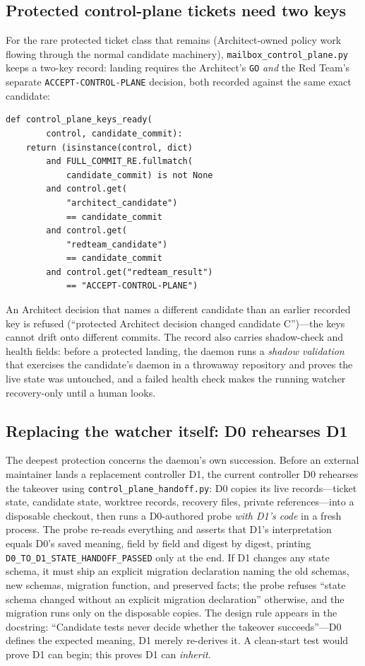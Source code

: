 \documentclass[10pt,aps,prd,twocolumn,nofootinbib]{revtex4-2}
\newcommand{\code}[1]{\texttt{#1}}
\newcommand{\file}[1]{\texttt{#1}}
\begin{document}
\subsection{Protected control-plane tickets need two keys}

For the rare protected ticket class that remains (Architect-owned
policy work flowing through the normal candidate machinery),
\file{mailbox\_control\_plane.py} keeps a two-key record: landing
requires the Architect's \code{GO} \emph{and} the Red Team's separate
\code{ACCEPT-CONTROL-PLANE} decision, both recorded against the same
exact candidate:

\begin{verbatim}
def control_plane_keys_ready(
        control, candidate_commit):
    return (isinstance(control, dict)
        and FULL_COMMIT_RE.fullmatch(
            candidate_commit) is not None
        and control.get(
            "architect_candidate")
            == candidate_commit
        and control.get(
            "redteam_candidate")
            == candidate_commit
        and control.get("redteam_result")
            == "ACCEPT-CONTROL-PLANE")
\end{verbatim}

An Architect decision that names a different candidate than an
earlier recorded key is refused (``protected Architect decision
changed candidate C'')---the keys cannot drift onto different
commits.  The record also carries shadow-check and health fields:
before a protected landing, the daemon runs a \emph{shadow
validation} that exercises the candidate's daemon in a throwaway
repository and proves the live state was untouched, and a failed
health check makes the running watcher recovery-only until a human
looks.

\subsection{Replacing the watcher itself: D0 rehearses D1}

The deepest protection concerns the daemon's own succession.  Before
an external maintainer lands a replacement controller D1, the current
controller D0 rehearses the takeover using
\file{control\_plane\_handoff.py}: D0 copies its live records---ticket
state, candidate state, worktree records, recovery files, private
references---into a disposable checkout, then runs a D0-authored probe
\emph{with D1's code} in a fresh process.  The probe re-reads
everything and asserts that D1's interpretation equals D0's saved
meaning, field by field and digest by digest, printing
\code{D0\_TO\_D1\_STATE\_HANDOFF\_PASSED} only at the end.  If D1
changes any state schema, it must ship an explicit migration
declaration naming the old schemas, new schemas, migration function,
and preserved facts; the probe refuses ``state schema changed without
an explicit migration declaration'' otherwise, and the migration runs
only on the disposable copies.  The design rule appears in the
docstring: ``Candidate tests never decide whether the takeover
succeeds''---D0 defines the expected meaning, D1 merely re-derives
it.  A clean-start test would prove D1 can begin; this proves D1 can
\emph{inherit}.
\end{document}
